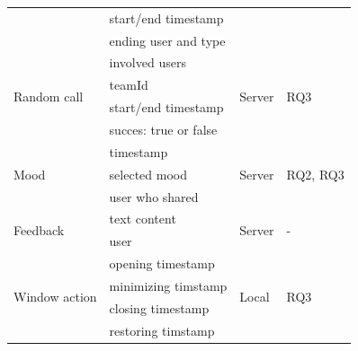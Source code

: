 \begin{table}[h]
\begin{tabularx}{.9\textwidth}{l X l l}
                                             & start/end timestamp                    &                         &                               \\
                                             & ending user and type                   &                         &                               \\
        \midrule
        \multirow{4}{*}{Random call}         & involved users                         & \multirow{4}{*}{Server} & \multirow{4}{*}{RQ3}          \\
                                             & teamId                                 &                         &                               \\
                                             & start/end timestamp                    &                         &                               \\
                                             & succes: true or false                  &                         &                               \\
        \midrule
        \multirow{3}{*}{Mood}                & timestamp                              & \multirow{3}{*}{Server} & \multirow{3}{*}{RQ2, RQ3}     \\
                                             & selected mood                          &                         &                               \\
                                             & user who shared                        &                         &                               \\
        \midrule
        \multirow{2}{*}{Feedback}            & text content                   & \multirow{2}{*}{Server} & \multirow{2}{*}{-}            \\
                                             & user                                   &                         &                               \\
        \midrule
        \multirow{4}{*}{Window action}       & opening timestamp                      & \multirow{4}{*}{Local}  & \multirow{4}{*}{RQ3}      \\
                                             & minimizing timstamp                    &                         &                               \\
                                             & closing timestamp                      &                         &                               \\
                                             & restoring timstamp                     &                         &                               \\


\end{tabularx}
\end{table}
